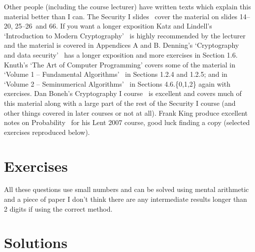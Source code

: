 \documentclass[11pt,a4paper]{article}
\newif\ifshowanswers
\newcommand{\slidesinitialmath}{14--20}
\newcommand{\slidesprobability}{25--26}
\newcommand{\slidesbirthday}{66}
\newcommand{\slidesall}{\slidesinitialmath, \slidesprobability\ and \slidesbirthday}
\begin{document}
Other people (including the course lecturer) have written texts which explain this material better than I can.
The Security I slides~\cite{SecurityISlides} cover the material on slides \slidesall.
If you want a longer exposition Katz and Lindell's `Introduction to Modern Cryptography'~\cite{Katz2008} is highly recommended by the lecturer and the material is covered in Appendices A and B.
Denning's `Cryptography and data security'~\cite{Denning1982} has a longer exposition and more exercises in Section 1.6.
Knuth's `The Art of Computer Programming' covers some of the material in `Volume 1 -- Fundamental Algorithms'~\cite{KnuthTAOCP1} in Sections 1.2.4 and 1.2.5; and in `Volume 2 -- Seminumerical Algorithms'~\cite{KnuthTAOCP2} in Sections 4.6.\{0,1,2\} again with exercises.
Dan Boneh's Cryptography I course~\cite{CryptoI} is excellent and covers much of this material along with a large part of the rest of the Security I course (and other things covered in later courses or not at all).
Frank King produce excellent notes on Probability~\cite{King2007} for his Lent 2007 course, good luck finding a copy (selected exercises reproduced below).

\section*{Exercises}
All these questions use small numbers and can be solved using mental arithmetic and a piece of paper I don't think there are any intermediate results longer than 2 digits if using the correct method.
\twocolumn
\showanswersfalse


\pagebreak
\section*{Solutions}
\showanswerstrue


\onecolumn

\printbibliography
\end{document}
